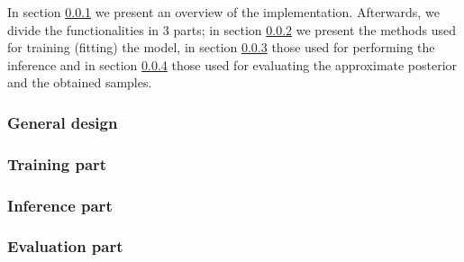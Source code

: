 In section \ref{subsec:general_design} we present an overview of the implementation. Afterwards, we divide the functionalities in 3 parts; in section \ref{subsec:training} we present the methods used for training (fitting) the model, in section \ref{subsec:inference} those used for performing the inference and in section \ref{subsec:evaluation} those used for evaluating the approximate posterior and the obtained samples. 

\subsubsection{General design} 
\label{subsec:general_design}


\subsubsection{Training part} 
\label{subsec:training}


\subsubsection{Inference part} 
\label{subsec:inference}


\subsubsection{Evaluation part} 
\label{subsec:evaluation}

